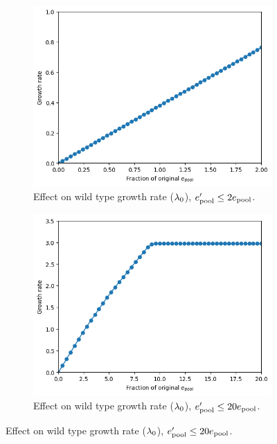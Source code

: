 \begin{figure}
  \begin{subfigure}[htpb]{0.45\textwidth}
   \centering
   \includegraphics[width=\textwidth]{epool_ec_gr}
   \caption{
     Effect on wild type growth rate ($\lambda_{0}$), $e_{\mathrm{pool}}^{\prime} \leq 2e_{\mathrm{pool}}$.
   }
   \label{fig:model-pool-growthrate}
  \end{subfigure}%
  \begin{subfigure}[htpb]{0.45\textwidth}
   \centering
   \includegraphics[width=\textwidth]{epool_ec_gr_20}
   \caption{
     Effect on wild type growth rate ($\lambda_{0}$), $e_{\mathrm{pool}}^{\prime} \leq 20e_{\mathrm{pool}}$.
   }
   \label{fig:model-pool-growthrate-20}
  \end{subfigure}


\end{figure}
